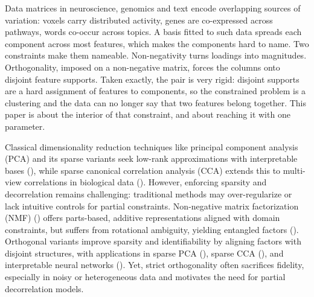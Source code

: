 \documentclass[
]{article}
\begin{document}
Data matrices in neuroscience, genomics and text encode overlapping sources of variation: voxels carry distributed activity, genes are co-expressed across pathways, words co-occur across topics. A basis fitted to such data spreads each component across most features, which makes the components hard to name. Two constraints make them nameable. Non-negativity turns loadings into magnitudes. Orthogonality, imposed on a non-negative matrix, forces the columns onto disjoint feature supports. Taken exactly, the pair is very rigid: disjoint supports are a hard assignment of features to components, so the constrained problem is a clustering and the data can no longer say that two features belong together. This paper is about the interior of that constraint, and about reaching it with one parameter.

Classical dimensionality reduction techniques like principal component analysis (PCA) and its sparse variants seek low-rank approximations with interpretable bases (), while sparse canonical correlation analysis (CCA) extends this to multi-view correlations in biological data (). However, enforcing sparsity and decorrelation remains challenging: traditional methods may over-regularize or lack intuitive controls for partial constraints. Non-negative matrix factorization (NMF) () offers parts-based, additive representations aligned with domain constraints, but suffers from rotational ambiguity, yielding entangled factors (). Orthogonal variants improve sparsity and identifiability by aligning factors with disjoint structures, with applications in sparse PCA (), sparse CCA (), and interpretable neural networks (). Yet, strict orthogonality often sacrifices fidelity, especially in noisy or heterogeneous data and motivates the need for partial decorrelation models.
\end{document}
